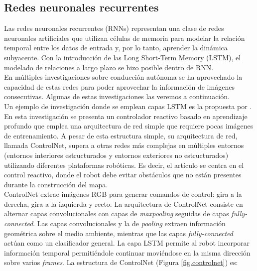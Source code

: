 \subsection{Redes neuronales recurrentes}


Las redes neuronales recurrentes (RNNs) representan una clase de redes neuronales artificiales que utilizan células de memoria para modelar la relación temporal entre los datos de entrada y, por lo tanto, aprender la dinámica subyacente. Con la introducción de las Long Short-Term Memory (LSTM), el modelado de relaciones a largo plazo se hizo posible dentro de RNN.\\

En múltiples investigaciones sobre conducción autónoma se ha aprovechado la capacidad de estas redes para poder aprovechar la información de imágenes consecutivas. Algunas de estas investigaciones las veremos a continuación.\\

Un ejemplo de investigación donde se emplean capas LSTM es la propuesta por \cite{reactive-ground}. En esta investigación se presenta un controlador reactivo basado en aprendizaje profundo que emplea una arquitectura de red simple que requiere pocas imágenes de entrenamiento. A pesar de esta estructura simple, su arquitectura de red, llamada ControlNet, supera a otras redes más complejas en múltiples entornos (entornos interiores estructurados y entornos exteriores no estructurados) utilizando diferentes plataformas robóticas. Es decir, el artículo se centra en el control reactivo, donde el robot debe evitar obstáculos que no están presentes durante la construcción del mapa.\\

ControlNet extrae imágenes RGB para generar comandos de control: gira a la derecha, gira a la izquierda y recto. La arquitectura de ControlNet consiste en alternar capas convolucionales con capas de \textit{maxpooling} seguidas de capas \textit{fully-connected}. Las capas convolucionales y la de \textit{pooling} extraen información geométrica sobre el medio ambiente, mientras que las capas \textit{fully-connected} actúan como un clasificador general. La capa LSTM permite al robot incorporar información temporal permitiéndole continuar moviéndose en la misma dirección sobre varios \textit{frames}. La estructura de ControlNet (Figura \ref{fig.controlnet}) es:

